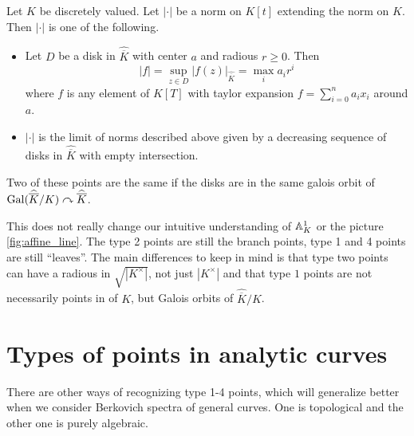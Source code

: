 \begin{proposition}
	Let $K$ be discretely valued. 
	Let $|\cdot |$ be a norm on $K[t]$ extending the norm on $K$. 
	Then $|\cdot |$ is one of the following.
	\begin{itemize}
		\item  Let $D$ be a disk in $\hat{\overline{K}}$ with center $a$ and radious $r  \ge 0$. 
			Then \[
				|f| = \sup_{z \in D} |f(z)|_{\hat{\overline{K}}} = \max_i a_i r^{i}
			\] 
			where $f$ is any element of $K[T]$ with taylor expansion $f = \sum_{i = 0}^{n} a_i x_i$ around $a$. 
		\item $|\cdot |$ is the limit of norms described above given by a decreasing sequence of disks in $\hat{\overline{K}}$ with empty intersection. 
	\end{itemize}
	Two of these points are the same if the disks are in the same galois orbit of $\operatorname{Gal}(\widehat{\overline{K}} / K) \curvearrowright \widehat{\overline{K}}$.  
\end{proposition}

This does not really change our intuitive understanding of $\mathbb{A}_{K}^{1}$ or the picture \cref{fig:affine_line}. 
The type 2 points are still the branch points, type 1 and 4 points are still ``leaves''.
The main differences to keep in mind is that type two points can have a radious in $\sqrt{|K^{\times }|} $, not just $|K^{\times }|$ and that type $1$ points are not necessarily points in of $K$, but Galois orbits of $\hat{\overline{K}} / K$. 




\section{Types of points in analytic curves} \label{sec:types_of_points_in_analytic_curves}
There are other ways of recognizing type 1-4 points, which will generalize better when we consider Berkovich spectra of general curves.
One is topological and the other one is purely algebraic. 

